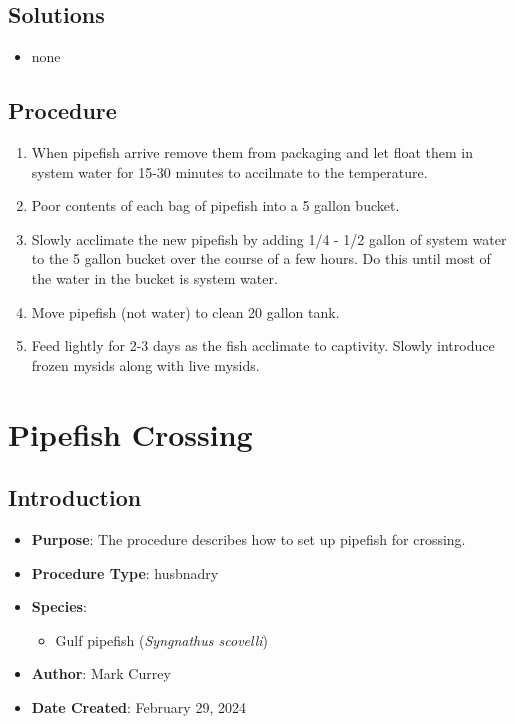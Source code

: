 \documentclass[
  letterpaper,
  DIV=11,
  numbers=noendperiod]{scrreprt}
\providecommand{\tightlist}{%
  \setlength{\itemsep}{0pt}\setlength{\parskip}{0pt}}\usepackage{longtable,booktabs,array}
\begin{document}
\hypertarget{solutions-45}{%
\section{Solutions}\label{solutions-45}}

\begin{itemize}
\tightlist
\item
  none
\end{itemize}

\hypertarget{procedure-54}{%
\section{Procedure}\label{procedure-54}}

\begin{enumerate}
\def\labelenumi{\arabic{enumi}.}
\tightlist
\item
  When pipefish arrive remove them from packaging and let float them in
  system water for 15-30 minutes to accilmate to the temperature.
\item
  Poor contents of each bag of pipefish into a 5 gallon bucket.
\item
  Slowly acclimate the new pipefish by adding 1/4 - 1/2 gallon of system
  water to the 5 gallon bucket over the course of a few hours. Do this
  until most of the water in the bucket is system water.
\item
  Move pipefish (not water) to clean 20 gallon tank.
\item
  Feed lightly for 2-3 days as the fish acclimate to captivity. Slowly
  introduce frozen mysids along with live mysids.
\end{enumerate}

\hypertarget{sec-husbandry_syng_cross}{%
\chapter{Pipefish Crossing}\label{sec-husbandry_syng_cross}}

\hypertarget{introduction-57}{%
\section{Introduction}\label{introduction-57}}

\begin{itemize}
\tightlist
\item
  \textbf{Purpose}: The procedure describes how to set up pipefish for
  crossing.
\item
  \textbf{Procedure Type}: husbnadry
\item
  \textbf{Species}:

  \begin{itemize}
  \tightlist
  \item
    Gulf pipefish (\emph{Syngnathus scovelli})
  \end{itemize}
\item
  \textbf{Author}: Mark Currey\\
\item
  \textbf{Date Created}: February 29, 2024
\end{itemize}
\end{document}
